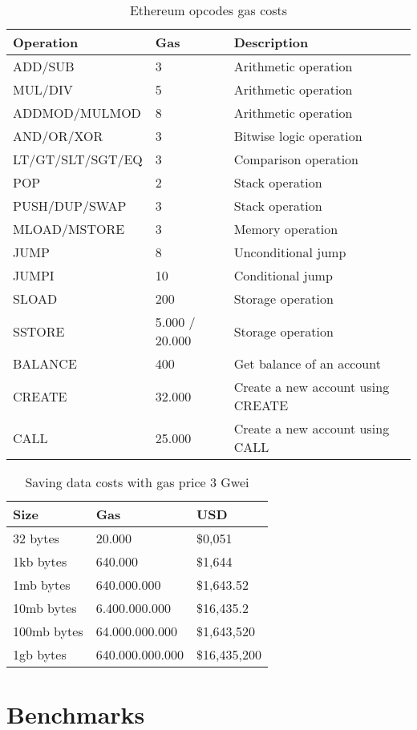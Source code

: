 \begin{table}[!ht]
\centering
\begin{tabular}{|l|l|l|}
\hline
 Operation & Gas  & Description \\ \hline
 ADD/SUB & 3 & Arithmetic operation \\ \hline
 MUL/DIV & 5 & Arithmetic operation \\ \hline
 ADDMOD/MULMOD & 8 & Arithmetic operation \\ \hline
 AND/OR/XOR & 3 & Bitwise logic operation \\ \hline
 LT/GT/SLT/SGT/EQ & 3 & Comparison operation \\ \hline
 POP & 2 & Stack operation \\ \hline
 PUSH/DUP/SWAP & 3 & Stack operation \\ \hline
 MLOAD/MSTORE & 3 & Memory operation \\ \hline
 JUMP & 8 & Unconditional jump \\ \hline
 JUMPI & 10 & Conditional jump \\ \hline
 SLOAD & 200 & Storage operation \\ \hline
 SSTORE & 5.000 / 20.000 & Storage operation \\ \hline
 BALANCE & 400 & Get balance of an account \\ \hline
 CREATE & 32.000 & Create a new account using CREATE \\ \hline
 CALL & 25.000 & Create a new account using CALL \\ \hline
\end{tabular}
\caption{Ethereum opcodes gas costs}
\label{table:opcode_gas_cost}
\end{table}

\begin{table}[!ht]
\centering
\begin{tabular}{|l|l|l|}
\hline
 Size & Gas  & USD \\ \hline
 32 bytes & 20.000  & \$0,051 \\ \hline
 1kb bytes & 640.000  & \$1,644 \\ \hline
 1mb bytes & 640.000.000  & \$1,643.52 \\ \hline
 10mb bytes & 6.400.000.000  & \$16,435.2 \\ \hline
 100mb bytes & 64.000.000.000  & \$1,643,520 \\ \hline
 1gb bytes & 640.000.000.000  & \$16,435,200 \\ \hline
\end{tabular}
\caption{Saving data costs with gas price 3 Gwei}
\label{table:bytes_usd_cost}
\end{table}

\section{Benchmarks}
\label{evaluation:benchmarks}
